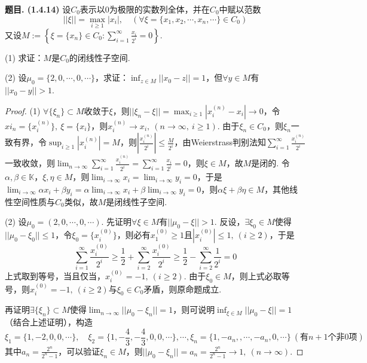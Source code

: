 \documentclass[12pt, a4paper, oneside]{ctexart}
\newcounter{problem}  %
\newenvironment{problem}[1][]{\stepcounter{problem}\par\noindent\textbf{题目\arabic{problem}. #1}}{\smallskip\par}
\let\leq=\leqslant %
\let\geq=\geqslant %
\def\K{\mathbb{K}}          %
\def\add{\vspace{1ex}}      %
\begin{document}
\begin{problem}[(1.4.14)]
    设$C_0$表示以$0$为极限的实数列全体，并在$C_0$中赋以范数
    \begin{equation*}
        ||\xi||=\max_{i\geq 1}|x_i|,\quad(\forall \xi = \{x_1,x_2,\cdots,x_n,\cdots\}\in C_0)
    \end{equation*}
    又设$M:=\left\{\xi=\{x_n\}\in C_0:\sum_{i=1}^\infty\frac{x_i}{2^i}=0\right\}$.\add

    (1) 求证：$M$是$C_0$的闭线性子空间.

    (2) 设$\mu_0 = \{2,0,\cdots, 0,\cdots\}$，求证：$\inf_{z\in M}||x_0-z||= 1$，但$\forall y\in M$有$||x_0-y|| > 1$.
\end{problem}
\begin{proof}
    (1) $\forall \{\xi_n\}\subset M$收敛于$\xi$，则$||\xi_n-\xi|| = \max_{i\geq 1}|x_i^{(n)}-x_i|\to 0$，令$xi_n = \{x_i^{(n)}\},\ \xi = \{x_i\}$，则$x_i^{(n)}\to x_i,\ (n\to \infty,\ i\geq 1)$. 由于$\xi_n\in C_0$，则$\xi_n$一致有界，令$\sup_{i\geq 1}|x_i^{(n)}| = M$，则$\left|\frac{x_i^{(n)}}{2^i}\right|\leq \frac{M}{2^i}$，由Weierstrass判别法知$\sum_{i=1}^\infty \frac{x_i^{(n)}}{2^i}$一致收敛，则$\lim_{n\to\infty}\sum_{i=1}^\infty \frac{x_i^{(n)}}{2^i} = \sum_{i=1}^\infty \frac{x_i}{2^i} = 0$，\add 则$\xi \in M$，故$M$是闭的. 令$\alpha,\beta\in \K$，$\xi,\eta\in M$，则$\lim_{i\to\infty}x_i= \lim_{i\to\infty}y_i = 0$，于是$\lim_{i\to\infty}\alpha x_i+\beta y_i = \alpha\lim_{i\to\infty}x_i+\beta\lim_{i\to\infty}y_i = 0$，则$\alpha \xi+\beta\eta\in M$，其他线性空间性质与$C_0$类似，故$M$是闭线性子空间.

    (2) 设$\mu_0 = (2,0,\cdots, 0,\cdots)$. 先证明$\forall \xi \in M$有$||\mu_0-\xi|| >1$. 反设，$\exists \xi_0\in M$使得$||\mu_0-\xi_0||\leq 1$，令$\xi_0=\{x_i^{(0)}\}$，则必有$x_1^{(0)}\geq 1$且$|x_i^{(0)}|\leq 1,\ (i\geq 2)$，于是
    \begin{equation*}
        \sum_{i=1}^\infty \frac{x_i^{(0)}}{2^i}\geq \frac{1}{2}+\sum_{i=2}^\infty \frac{x_i^{(0)}}{2^i}\geq \frac{1}{2}-\sum_{i=2}^\infty\frac{1}{2^i} = 0
    \end{equation*}
    上式取到等号，当且仅当，$x_i^{(0)} = -1,\ (i\geq 2)$. 由于$\xi_0\in M$，则上式必取等号，则$x_i^{(0)}= -1,\ (i\geq 2)$与$\xi_0\in C_0$矛盾，则原命题成立.

    再证明$\exists \{\xi_n\}\subset M$使得$\lim_{n\to\infty}||\mu_0-\xi_n||=1$，则可说明$\inf_{\xi\in M}||\mu_0-\xi||=1$（结合上述证明），构造
    \begin{equation*}
        \xi_1 = \{1,-2,0,0,\cdots\},\quad \xi_2=\{1,-\frac{4}{3},-\frac{4}{3},0,0,\cdots\},\cdots,\xi_n=\{1,-a_n,,\cdots,-a_n,0,\cdots\}\ (\text{有}n+1\text{个非}0\text{项})
    \end{equation*}
    其中$a_n=\frac{2^n}{2^n-1}$，可以验证$\xi_n\in M$，则$||\mu_0-\xi_n|| = a_n=\frac{2^n}{2^n-1}\to 1,\ (n\to\infty)$.
\end{proof}
\end{document}
